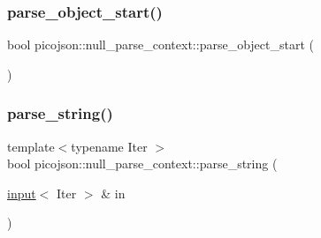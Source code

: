 \hypertarget{classpicojson_1_1null__parse__context_a95c208456592c33d53548fa88b831c7c}{}\label{classpicojson_1_1null__parse__context_a95c208456592c33d53548fa88b831c7c} 
\subsubsection{\texorpdfstring{parse\+\_\+object\+\_\+start()}{parse\_object\_start()}}
{\footnotesize\ttfamily bool picojson\+::null\+\_\+parse\+\_\+context\+::parse\+\_\+object\+\_\+start (\begin{DoxyParamCaption}{ }\end{DoxyParamCaption})\hspace{0.3cm}{\ttfamily [inline]}}

\hypertarget{classpicojson_1_1null__parse__context_aab2c7dee1eb5b477370832811cd40d14}{}\label{classpicojson_1_1null__parse__context_aab2c7dee1eb5b477370832811cd40d14} 
\subsubsection{\texorpdfstring{parse\+\_\+string()}{parse\_string()}}
{\footnotesize\ttfamily template$<$typename Iter $>$ \\
bool picojson\+::null\+\_\+parse\+\_\+context\+::parse\+\_\+string (\begin{DoxyParamCaption}\item[{\hyperlink{classpicojson_1_1input}{input}$<$ Iter $>$ \&}]{in }\end{DoxyParamCaption})\hspace{0.3cm}{\ttfamily [inline]}}

\hypertarget{classpicojson_1_1null__parse__context_aa77397f08cf7859fabc04e9e4460b93a}{}\label{classpicojson_1_1null__parse__context_aa77397f08cf7859fabc04e9e4460b93a} 
